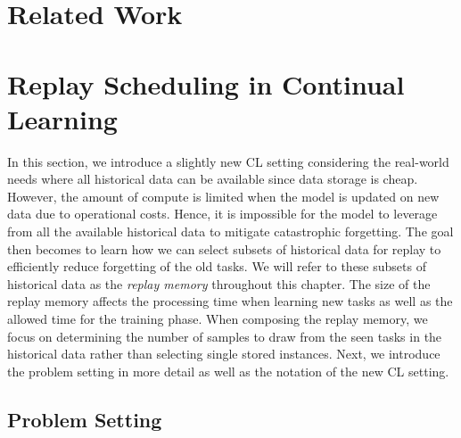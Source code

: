 \section{Related Work}

\section{Replay Scheduling in Continual Learning} 

In this section, we introduce a slightly new CL setting considering the real-world needs where all historical data can be available since data storage is cheap. However, the amount of compute is limited when the model is updated on new data due to operational costs. Hence, it is impossible for the model to leverage from all the available historical data to mitigate catastrophic forgetting. The goal then becomes to learn how we can select subsets of historical data for replay to efficiently reduce forgetting of the old tasks. We will refer to these subsets of historical data as the \textit{replay memory} throughout this chapter. The size of the replay memory affects the processing time when learning new tasks as well as the allowed time for the training phase. When composing the replay memory, we focus on determining the number of samples to draw from the seen tasks in the historical data rather than selecting single stored instances. Next, we introduce the problem setting in more detail as well as the notation of the new CL setting. 


\subsection{Problem Setting}







